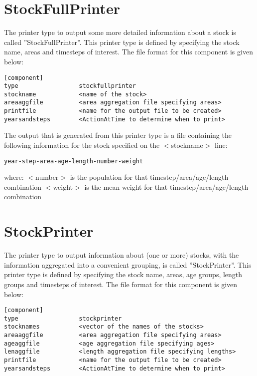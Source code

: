 \documentclass [a4paper, 10pt]{book}
\begin{document}
\section{StockFullPrinter}\label{sec:stockfullprinter}
The printer type to output some more detailed information about a stock is called ''StockFullPrinter''.  This printer type is defined by specifying the stock name, areas and timesteps of interest.  The file format for this component is given below:

{\small\begin{verbatim}
[component]
type                 stockfullprinter
stockname            <name of the stock>
areaaggfile          <area aggregation file specifying areas>
printfile            <name for the output file to be created>
yearsandsteps        <ActionAtTime to determine when to print>
\end{verbatim}}

The output that is generated from this printer type is a file containing the following information for the stock specified on the $<$stockname$>$ line:

{\small\begin{verbatim}
year-step-area-age-length-number-weight
\end{verbatim}}

where:\newline
$<$number$>$ is the population for that timestep/area/age/length combination\newline
$<$weight$>$ is the mean weight for that timestep/area/age/length combination

\section{StockPrinter}\label{sec:stockprinter}
The printer type to output information about (one or more) stocks, with the information aggregated into a convenient grouping, is called ''StockPrinter''.  This printer type is defined by specifying the stock name, areas, age groups, length groups and timesteps of interest.  The file format for this component is given below:

{\small\begin{verbatim}
[component]
type                 stockprinter
stocknames           <vector of the names of the stocks>
areaaggfile          <area aggregation file specifying areas>
ageaggfile           <age aggregation file specifying ages>
lenaggfile           <length aggregation file specifying lengths>
printfile            <name for the output file to be created>
yearsandsteps        <ActionAtTime to determine when to print>
\end{verbatim}}
\end{document}
